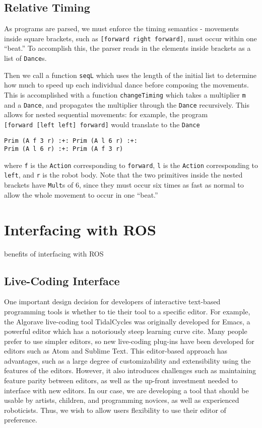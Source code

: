 \documentclass[sigconf]{acmart}
\begin{document}
\subsection{Relative Timing}\label{relative-timing}

As programs are parsed, we must enforce the timing semantics - movements
inside square brackets, such as \texttt{{[}forward\ right\ forward{]}},
must occur within one ``beat.'' To accomplish this, the parser reads in
the elements inside brackets as a list of \texttt{Dance}s.

Then we call a function \texttt{seqL} which uses the length of the
initial list to determine how much to speed up each individual dance
before composing the movements. This is accomplished with a function
\texttt{changeTiming} which takes a multiplier \texttt{m} and a
\texttt{Dance}, and propagates the multiplier through the \texttt{Dance}
recursively. This allows for nested sequential movements: for example,
the program \texttt{{[}forward\ {[}left\ left{]}\ forward{]}} would
translate to the \texttt{Dance}

\begin{verbatim}
Prim (A f 3 r) :+: Prim (A l 6 r) :+: 
Prim (A l 6 r) :+: Prim (A f 3 r)
\end{verbatim}

where \texttt{f} is the \texttt{Action} corresponding to
\texttt{forward}, \texttt{l} is the \texttt{Action} corresponding to
\texttt{left}, and \texttt{r} is the robot body. Note that the two
primitives inside the nested brackets have \texttt{Mult}s of 6, since
they must occur six times as fast as normal to allow the whole movement
to occur in one ``beat.''

\section{Interfacing with ROS}\label{interfacing-with-ros}

{\color{red}benefits of interfacing with ROS}

\subsection{Live-Coding Interface}\label{live-coding-interface}

One important design decision for developers of interactive text-based
programming tools is whether to tie their tool to a specific editor. For
example, the Algorave live-coding tool TidalCycles was originally
developed for Emacs, a powerful editor which has a notoriously steep
learning curve {\color{red} cite}. Many people prefer to use simpler editors, so new
live-coding plug-ins have been developed for editors such as Atom and
Sublime Text. This editor-based approach has advantages, such as a large
degree of customizability and extensibility using the features of the
editors. However, it also introduces challenges such as maintaining
feature parity between editors, as well as the up-front investment
needed to interface with new editors. In our case, we are developing a
tool that should be usable by artists, children, and programming
novices, as well as experienced roboticists. Thus, we wish to allow
users flexibility to use their editor of preference.
\end{document}
